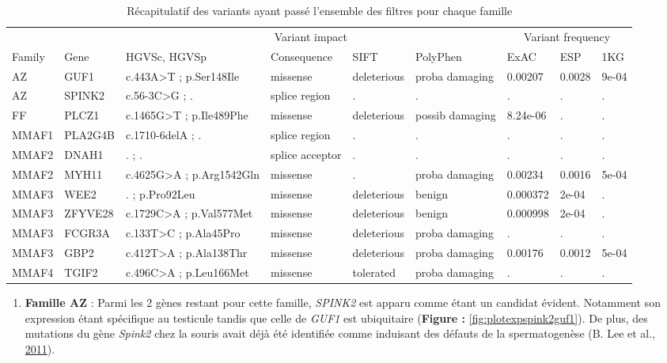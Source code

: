 \documentclass[12pt,twoside]{reedthesis}
\providecommand{\tightlist}{%
  \setlength{\itemsep}{0pt}\setlength{\parskip}{0pt}}
\theoremstyle{definition}
\theoremstyle{definition}
\theoremstyle{remark}
\begin{document}
  \newpage
  
  \begin{landscape}
  \begin{longtable}[t]{lllllllll}
  \caption{\label{tab:tablegene}Récapitulatif des variants ayant passé l'ensemble des filtres pour chaque famille}\\
  \toprule
  \multicolumn{1}{c}{ } & \multicolumn{1}{c}{ } & \multicolumn{4}{c}{Variant impact} & \multicolumn{3}{c}{Variant frequency} \\
  \cmidrule(l{2pt}r{2pt}){3-6} \cmidrule(l{2pt}r{2pt}){7-9}
  Family & Gene & HGVSc, HGVSp & Consequence & SIFT & PolyPhen & ExAC & ESP & 1KG\\
  \midrule
  AZ & GUF1 & c.443A>T ; p.Ser148Ile & missense & deleterious & proba damaging & 0.00207 & 0.0028 & 9e-04\\
  AZ & SPINK2 & c.56-3C>G ; . & splice region & . & . & . & . & .\\
  FF & PLCZ1 & c.1465G>T ; p.Ile489Phe & missense & deleterious & possib damaging & 8.24e-06 & . & .\\
  MMAF1 & PLA2G4B & c.1710-6delA ; . & splice region & . & . & . & . & .\\
  MMAF2 & DNAH1 & . ; . & splice acceptor & . & . & . & . & .\\
  \addlinespace
  MMAF2 & MYH11 & c.4625G>A ; p.Arg1542Gln & missense & . & proba damaging & 0.00234 & 0.0016 & 5e-04\\
  MMAF3 & WEE2 & . ; p.Pro92Leu & missense & deleterious & benign & 0.000372 & 2e-04 & .\\
  MMAF3 & ZFYVE28 & c.1729C>A ; p.Val577Met & missense & deleterious & benign & 0.000998 & 2e-04 & .\\
  MMAF3 & FCGR3A & c.133T>C ; p.Ala45Pro & missense & deleterious & proba damaging & . & . & .\\
  MMAF3 & GBP2 & c.412T>A ; p.Ala138Thr & missense & deleterious & proba damaging & 0.00176 & 0.0012 & 5e-04\\
  MMAF4 & TGIF2 & c.496C>A ; p.Leu166Met & missense & tolerated & proba damaging & . & . & .\\
  \bottomrule
  \end{longtable}
  \end{landscape}
  
  \newpage
  
  \begin{enumerate}
  \def\labelenumi{\arabic{enumi}.}
  \tightlist
  \item
    \textbf{Famille AZ} : Parmi les 2 gènes restant pour cette famille,
    \emph{SPINK2} est apparu comme étant un candidat évident. Notamment
    son expression étant spécifique au testicule tandis que celle de
    \emph{GUF1} est ubiquitaire (\textbf{Figure :
    }\ref{fig:plotexpspink2guf1}). De plus, des mutations du gène
    \emph{Spink2} chez la souris avait déjà été identifiée comme induisant
    des défauts de la spermatogenèse (B. Lee et al.,
    \protect\hyperlink{ref-Lee2011}{2011}).
  \end{enumerate}
  
\end{document}
